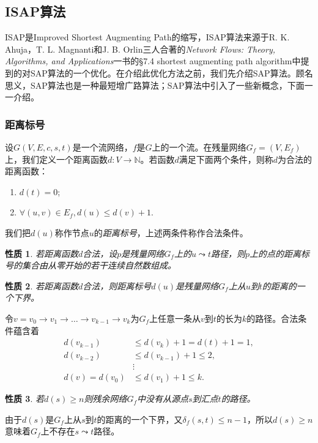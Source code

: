 \documentclass[a4paper]{ctexbook}
\newtheorem{property}{性质}[chapter]
\begin{document}

  \subsection{ISAP算法}
  ISAP是Improved Shortest Augmenting Path的缩写，ISAP算法来源于R. K. Ahuja，T. L. Magnanti和J. B. Orlin三人合著的\emph{Network Flows: Theory, Algorithms, and Applications}一书的\S 7.4 shortest augmenting path algorithm中提到的对SAP算法的一个优化。在介绍此优化方法之前，我们先介绍SAP算法。顾名思义，SAP算法也是一种最短增广路算法；SAP算法中引入了一些新概念，下面一一介绍。
  \subsubsection*{距离标号}
  设$G(V,E,c,s,t)$是一个流网络，$f$是$G$上的一个流。在残量网络$G_f=(V,E_f)$上，我们定义一个距离函数$d\colon V\to\mathbb{N}$。若函数$d$满足下面两个条件，则称$d$为合法的距离函数：
  \begin{enumerate}
      \item $d(t) = 0$;
      \item $\forall (u,v)\in E_f, d(u) \le d(v) +1$.
  \end{enumerate}
  我们把$d(u)$称作节点$u$的\emph{距离标号}，上述两条件称作合法条件。
  \begin{property}
    若距离函数$d$合法，设$p$是残量网络$G_f$上的$u\leadsto t$路径，则$p$上的点的距离标号的集合由从零开始的若干连续自然数组成。
  \end{property}
  \begin{property}\label{P:lower_bound}
      若距离函数$d$合法，则距离标号$d(u)$是残量网络$G_f$上从$u$到$t$的距离的一个下界。
  \end{property}
  令$v=v_0\to v_1 \to\dots\to v_{k-1}\to v_k$为$G_f$上任意一条从$v$到$t$的长为$k$的路径。合法条件蕴含着
  \begin{align*}
      d(v_{k-1})&\le d(v_k)+1 = d(t)+1=1,\\
      d(v_{k-2})&\le d(v_{k-1})+1\le 2,\\
       &\vdots\\
      d(v) = d(v_0)&\le d(v_1) + 1 \le k.
  \end{align*}
  \begin{property}
      若$d(s)\ge n$则残余网络$G_f$中没有从源点$s$到汇点$t$的路径。
  \end{property}
  由于$d(s)$是$G_f$上从$s$到$t$的距离的一个下界，又$\delta_f(s,t)\le n-1$，所以$d(s)\ge n$意味着$G_f$上不存在$s\leadsto t$路径。
\end{document}
